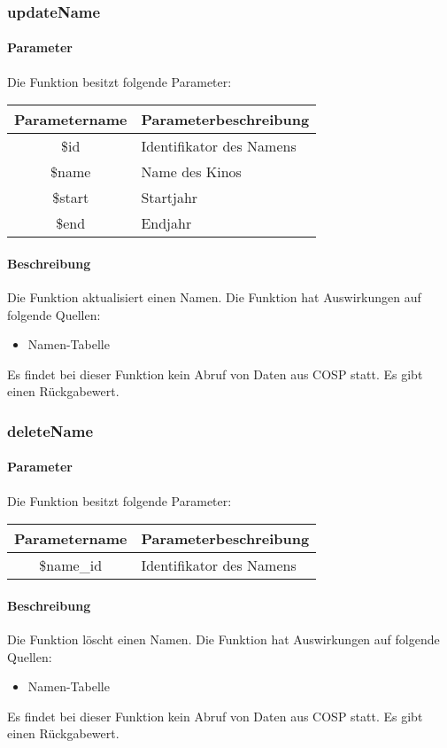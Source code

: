 \subsubsection{updateName}
\paragraph{Parameter} Die Funktion besitzt folgende Parameter:
\begin{table}[H]
	\begin{tabular}{|c|p{11cm}|}
		\hline
		\textbf{Parametername} & \textbf{Parameterbeschreibung} \\ \hline
		\$id    & Identifikator des Namens \\ \hline
		\$name  & Name des Kinos \\ \hline
		\$start & Startjahr \\ \hline
		\$end   & Endjahr \\ \hline
	\end{tabular}
\end{table}
\paragraph{Beschreibung} Die Funktion aktualisiert einen Namen. Die Funktion hat Auswirkungen auf folgende Quellen:
\begin{itemize}
	\item Namen-Tabelle
\end{itemize}
Es findet bei dieser Funktion kein Abruf von Daten aus {\glqq COSP\grqq} statt. Es gibt einen Rückgabewert.
\subsubsection{deleteName}
\paragraph{Parameter} Die Funktion besitzt folgende Parameter:
\begin{table}[H]
	\begin{tabular}{|c|p{11cm}|}
		\hline
		\textbf{Parametername} & \textbf{Parameterbeschreibung} \\ \hline
		\$name\_id & Identifikator des Namens \\ \hline
	\end{tabular}
\end{table}
\paragraph{Beschreibung} Die Funktion löscht einen Namen. Die Funktion hat Auswirkungen auf folgende Quellen:
\begin{itemize}
	\item Namen-Tabelle
\end{itemize}
Es findet bei dieser Funktion kein Abruf von Daten aus {\glqq COSP\grqq} statt. Es gibt einen Rückgabewert.
